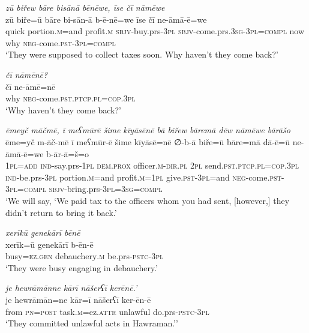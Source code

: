 \ea \label{BP.58}
\textit{zū biřew bāre bisānā bēnēwe, īse čī nāmēwe} \\ 
\gll zū biře=ū bāre bi-sān-ā b-ē-nē=we īse čī ne-āmā-ē=we \\ 
 quick portion\textsc{.m}=and profit\textsc{.m} \textsc{sbjv-}buy.prs\textsc{-3pl} \textsc{sbjv-}come.prs\textsc{.3sg}\textsc{-3pl}\textsc{=compl} now why \textsc{neg-}come\textsc{.pst}\textsc{-3pl}\textsc{=compl} \\ 
\glt `They were supposed to collect taxes soon. Why haven’t they come back?'
\z 
 
\ea \label{BP.59}
\textit{čī nāmēnē?} \\ 
\gll čī ne-āmē=nē \\ 
 why \textsc{neg-}come\textsc{.pst}\textsc{.ptcp}\textsc{.pl}\textsc{=cop}\textsc{.3pl} \\ 
\glt `Why haven’t they come back?'
\z 
 
\ea \label{BP.60}
\textit{ēmeyč māčmē, ī meʕmūrē šime kīyāsēnē bā biřew bāremā dēw nāmēwe bārāšo} \\ 
\gll ēme=yč m-āč-mē ī meʕmūr-ē šime kīyāsē=nē ∅-b-ā biře=ū bāre=mā dā-ē=ū ne-āmā-ē=we b-ār-ā=š=o \\ 
 \textsc{1pl}\textsc{=add} \textsc{ind-}say.prs\textsc{-\textsc{1pl}} \textsc{dem.prox} officer\textsc{.m}\textsc{-dir}\textsc{.pl} \textsc{2pl} send\textsc{.pst}\textsc{.ptcp}\textsc{.pl}\textsc{=cop}\textsc{.3pl} \textsc{ind-}be.prs\textsc{-3pl} portion\textsc{.m}=and profit\textsc{.m}\textsc{=\textsc{1pl}} give\textsc{.pst}\textsc{-3pl}=and \textsc{neg-}come\textsc{.pst}\textsc{-3pl}\textsc{=compl} \textsc{sbjv-}bring.prs\textsc{-3pl}\textsc{=3sg}\textsc{=compl} \\ 
\glt `We will say, ‘We paid tax to the officers whom you had sent, [however,] they didn’t return to bring it back.'
\z 
 
\ea \label{BP.61}
\textit{xerīkū genekārī bēnē} \\ 
\gll xerīk=ū genekārī b-ēn-ē \\ 
 busy\textsc{=ez.gen} debauchery\textsc{.m} be.prs\textsc{-pstc}\textsc{-3pl} \\ 
\glt `They were busy engaging in debauchery.'
\z 
 
\ea \label{BP.62}
\textit{je hewrāmānne kārī nāšerʕī kerēnē.’} \\ 
\gll je hewrāmān=ne kār=ī nāšerʕī ker-ēn-ē \\ 
 from \textsc{pn}\textsc{=\textsc{post}} task\textsc{.m}=ez.\textsc{attr} unlawful do.prs\textsc{-pstc}\textsc{-3pl} \\ 
\glt `They committed unlawful acts in Hawraman.’'
\z 
 
